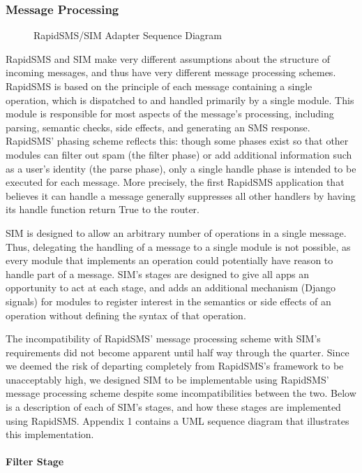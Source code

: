 \documentclass{acm_proc_article-sp}
\begin{document}
\subsubsection{Message Processing}

\begin{figure*}
\centering
{}
\caption{RapidSMS/SIM Adapter Sequence Diagram}
\end{figure*}

RapidSMS and SIM make very different assumptions about the structure of incoming messages, and thus have very different message processing schemes. RapidSMS is based on the principle of each message containing a single operation, which is dispatched to and handled primarily by a single module. This module is responsible for most aspects of the message's processing, including parsing, semantic checks, side effects, and generating an SMS response. RapidSMS' phasing scheme reflects this: though some phases exist so that other modules can filter out spam (the filter phase) or add additional information such as a user's identity (the parse phase), only a single handle phase is intended to be executed for each message. More precisely, the first RapidSMS application that believes it can handle a message generally suppresses all other handlers by having its handle function return True to the router.

SIM is designed to allow an arbitrary number of operations in a single message. Thus, delegating the handling of a message to a single module is not possible, as every module that implements an operation could potentially have reason to handle part of a message. SIM's stages are designed to give all apps an opportunity to act at each stage, and adds an additional mechanism (Django signals) for modules to register interest in the semantics or side effects of an operation without defining the syntax of that operation.

The incompatibility of RapidSMS' message processing scheme with SIM's requirements did not become apparent until half way through the quarter. Since we deemed the risk of departing completely from RapidSMS's framework to be unacceptably high, we designed SIM to be implementable using RapidSMS' message processing scheme despite some incompatibilities between the two. Below is a description of each of SIM's stages, and how these stages are implemented using RapidSMS. Appendix 1 contains a UML sequence diagram that illustrates this implementation.

\paragraph{Filter Stage}
\end{document}
